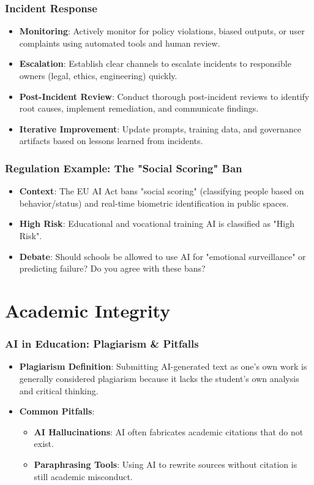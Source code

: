 \documentclass{beamer}
\begin{document}
\begin{frame}
    \frametitle{Incident Response}
    \begin{itemize}
        \item \textbf{Monitoring}: Actively monitor for policy violations, biased outputs, or user complaints using automated tools and human review.
        \item \textbf{Escalation}: Establish clear channels to escalate incidents to responsible owners (legal, ethics, engineering) quickly.
        \item \textbf{Post-Incident Review}: Conduct thorough post-incident reviews to identify root causes, implement remediation, and communicate findings.
        \item \textbf{Iterative Improvement}: Update prompts, training data, and governance artifacts based on lessons learned from incidents.
    \end{itemize}
\end{frame}

\begin{frame}
    \frametitle{Regulation Example: The "Social Scoring" Ban}
    \begin{itemize}
        \item \textbf{Context}: The EU AI Act bans "social scoring" (classifying people based on behavior/status) and real-time biometric identification in public spaces.
        \item \textbf{High Risk}: Educational and vocational training AI is classified as "High Risk".
        \item \textbf{Debate}: Should schools be allowed to use AI for "emotional surveillance" or predicting failure? Do you agree with these bans?
    \end{itemize}
\end{frame}





\section{Academic Integrity}

\begin{frame}
    \frametitle{AI in Education: Plagiarism \& Pitfalls}
    \begin{itemize}
        \item \textbf{Plagiarism Definition}: Submitting AI-generated text as one's own work is generally considered plagiarism because it lacks the student's own analysis and critical thinking.
        \item \textbf{Common Pitfalls}:
        \begin{itemize}
            \item \textbf{AI Hallucinations}: AI often fabricates academic citations that do not exist.
            \item \textbf{Paraphrasing Tools}: Using AI to rewrite sources without citation is still academic misconduct.
        \end{itemize}
    \end{itemize}
\end{frame}
\end{document}
